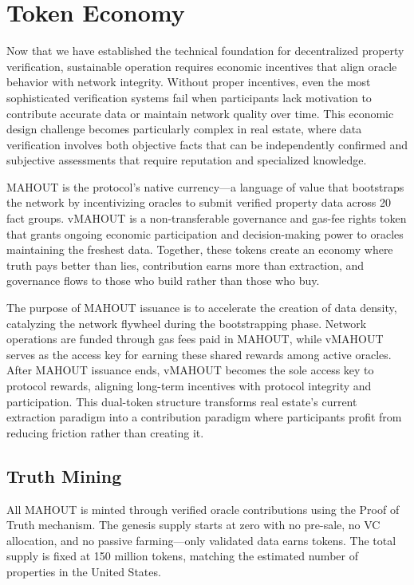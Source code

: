 \chapter{Token Economy}

Now that we have established the technical foundation for decentralized property verification, sustainable operation requires economic incentives that align oracle behavior with network integrity. Without proper incentives, even the most sophisticated verification systems fail when participants lack motivation to contribute accurate data or maintain network quality over time. This economic design challenge becomes particularly complex in real estate, where data verification involves both objective facts that can be independently confirmed and subjective assessments that require reputation and specialized knowledge.

MAHOUT is the protocol's native currency---a language of value that bootstraps the network by incentivizing oracles to submit verified property data across 20 fact groups. vMAHOUT is a non-transferable governance and gas-fee rights token that grants ongoing economic participation and decision-making power to oracles maintaining the freshest data. Together, these tokens create an economy where truth pays better than lies, contribution earns more than extraction, and governance flows to those who build rather than those who buy.

The purpose of MAHOUT issuance is to accelerate the creation of data density, catalyzing the network flywheel during the bootstrapping phase. Network operations are funded through gas fees paid in MAHOUT, while vMAHOUT serves as the access key for earning these shared rewards among active oracles. After MAHOUT issuance ends, vMAHOUT becomes the sole access key to protocol rewards, aligning long-term incentives with protocol integrity and participation. This dual-token structure transforms real estate's current extraction paradigm into a contribution paradigm where participants profit from reducing friction rather than creating it.

\section{Truth Mining}

All MAHOUT is minted through verified oracle contributions using the Proof of Truth mechanism. The genesis supply starts at zero with no pre-sale, no VC allocation, and no passive farming---only validated data earns tokens. The total supply is fixed at 150 million tokens, matching the estimated number of properties in the United States.

